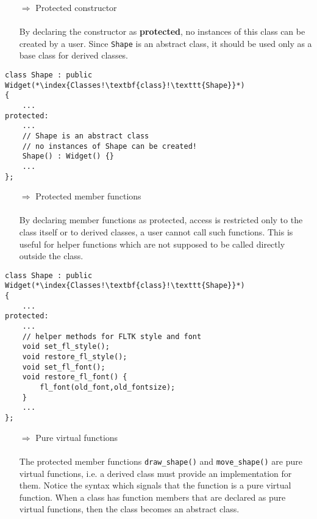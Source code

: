 \documentclass[10pt]{book}
\begin{document}
\begin{enumerate}
\item[$\Rightarrow$] Protected constructor\\ \\ By declaring the constructor as \textbf{protected}, no instances of this class can be created by a user. Since \texttt{Shape} is an abstract class, it should be used only as a base class for derived classes.
\end{enumerate}
\begin{lstlisting}
class Shape : public Widget(*\index{Classes!\textbf{class}!\texttt{Shape}}*)
{
    ...
protected:
    ...
    // Shape is an abstract class
    // no instances of Shape can be created!
    Shape() : Widget() {}
    ...
};
\end{lstlisting}
\begin{enumerate}
\item[$\Rightarrow$] Protected member functions\\ \\ By declaring member functions as protected, access is restricted only to the class itself or to derived classes, a user cannot call such functions. This is useful for helper functions which are not supposed to be called directly outside the class.
\end{enumerate}
\begin{lstlisting}
class Shape : public Widget(*\index{Classes!\textbf{class}!\texttt{Shape}}*)
{
    ...
protected:
    ...
    // helper methods for FLTK style and font
    void set_fl_style();
    void restore_fl_style();
    void set_fl_font();
    void restore_fl_font() {
        fl_font(old_font,old_fontsize);
    }
    ...
};
\end{lstlisting}
\begin{enumerate}
\item[$\Rightarrow$] Pure virtual functions\\ \\ The protected member functions \texttt{draw\_shape()} and \texttt{move\_shape()} are pure virtual functions, i.e. a derived class must provide an implementation for them. Notice the syntax  which signals that the function is a pure virtual function. When a class has function members that are declared as pure virtual functions, then the class becomes an abstract class.
\end{enumerate}
\end{document}

